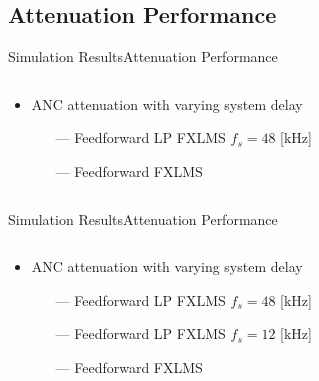 \subsection{Attenuation Performance}
\begin{frame}{Simulation Results}{Attenuation Performance}		
\begin{columns}
	\begin{column}{0.4\textwidth}
	\begin{itemize}
		\item ANC attenuation with varying system delay
		\begin{itemize}
				\item[\textcolor{MATLABorange}{---}] Feedforward LP FXLMS $f_s= 48$ [kHz] 
				\item[\textcolor{MATLABblue}{---}] Feedforward FXLMS 
		\end{itemize}
	\end{itemize}
	\end{column}
	\begin{column}{0.6\textwidth} 
		\resizebox{0.9\columnwidth}{!}{		
			}
	\end{column}
\end{columns}
\end{frame}





\begin{frame}{Simulation Results}{Attenuation Performance}		
\begin{columns}
	\begin{column}{0.4\textwidth}
	\begin{itemize}
		\item ANC attenuation with varying system delay
		\begin{itemize}
				\item[\textcolor{MATLABorange}{---}] Feedforward LP FXLMS $f_s= 48$ [kHz] 
				\item[\textcolor{MATLABblue}{---}] Feedforward LP FXLMS $f_s= 12$ [kHz] 
				\item[\textcolor{MATLABblue}{---}] Feedforward FXLMS 
		\end{itemize}
	\end{itemize}
	\end{column}
	\begin{column}{0.6\textwidth} 
		\resizebox{0.9\columnwidth}{!}{		
			}
	\end{column}
\end{columns}
\end{frame}






